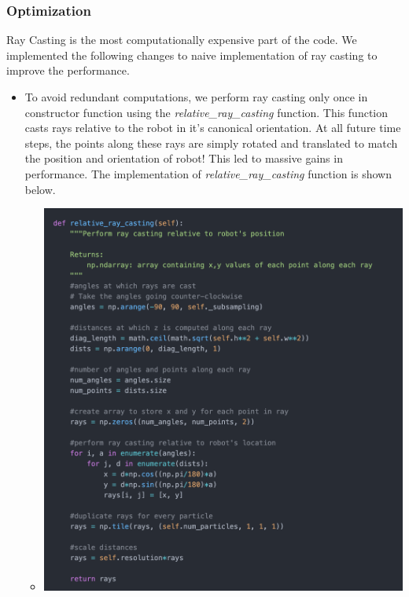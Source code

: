 \documentclass[12pt, a4paper]{article}
\begin{document}
\subsubsection{Optimization}
Ray Casting is the most computationally expensive part of the code. We implemented the following changes to naive implementation of ray casting to improve the performance.

\begin{itemize}
  \item To avoid redundant computations, we perform ray casting only once in constructor function using the \textit{relative\_ray\_casting} function. This function casts rays relative to the robot in it's canonical orientation. At all future time steps, the points along these rays are simply rotated and translated to match the position and orientation of robot! This led to massive gains in performance. The implementation of \textit{relative\_ray\_casting} function is shown below.
  \begin{itemize}
    \item 
    \begin{minipage}[t]{\linewidth}
      \vspace{0pt}
      \begin{center}
        \includegraphics[scale=0.3]{./results/ray_casting_opt_1.png}

\end{center}
\end{minipage}
\end{itemize}
\end{itemize}
\end{document}
